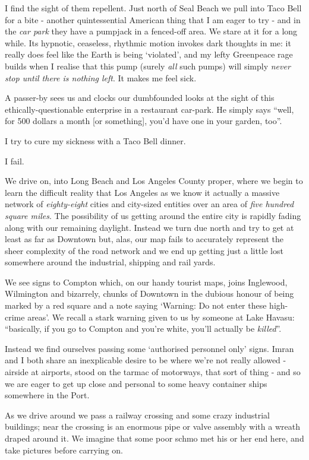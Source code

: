 \documentclass[a5paper,titlepage,11pt]{book}
\begin{document}
I find the sight of them repellent.  Just north of Seal Beach we pull into Taco Bell for a bite - another quintessential American thing that I am eager to try - and in the \emph{car park} they have a pumpjack in a fenced-off area.  We stare at it for a long while.  Its hypnotic, ceaseless, rhythmic motion invokes dark thoughts in me: it really does feel like the Earth is being `violated', and my lefty Greenpeace rage builds when I realise that this pump (surely \emph{all} such pumps) will simply \emph{never stop until there is nothing left}.  It makes me feel sick.

A passer-by sees us and clocks our dumbfounded looks at the sight of this ethically-questionable enterprise in a restaurant car-park.  He simply says ``well, for 500 dollars a month {\footnotesize [or something]}, you'd have one in your garden, too''.

I try to cure my sickness with a Taco Bell dinner.

I fail.

We drive on, into Long Beach and Los Angeles County proper, where we begin to learn the difficult reality that Los Angeles as we know it actually a massive network of \emph{eighty-eight} cities and city-sized entities over an area of \emph{five hundred square miles}.  The possibility of us getting around the entire city is rapidly fading along with our remaining daylight.  Instead we turn due north and try to get at least as far as Downtown but, alas, our map fails to accurately represent the sheer complexity of the road network and we end up getting just a little lost somewhere around the industrial, shipping and rail yards.

We see signs to Compton which, on our handy tourist maps, joins Inglewood, Wilmington and bizarrely, chunks of Downtown in the dubious honour of being marked by a red square and a note saying `Warning: Do not enter these high-crime areas'.  We recall a stark warning given to us by someone at Lake Havasu:  ``basically, if you go to Compton and you're white, you'll actually be \emph{killed}''.

Instead we find ourselves passing some `authorised personnel only' signs.  Imran and I both share an inexplicable desire to be where we're not really allowed - airside at airports, stood on the tarmac of motorways, that sort of thing - and so we are eager to get up close and personal to some heavy container ships somewhere in the Port.

As we drive around we pass a railway crossing and some crazy industrial buildings; near the crossing is an enormous pipe or valve assembly with a wreath draped around it.  We imagine that some poor schmo met his or her end here, and take pictures before carrying on.
\end{document}

